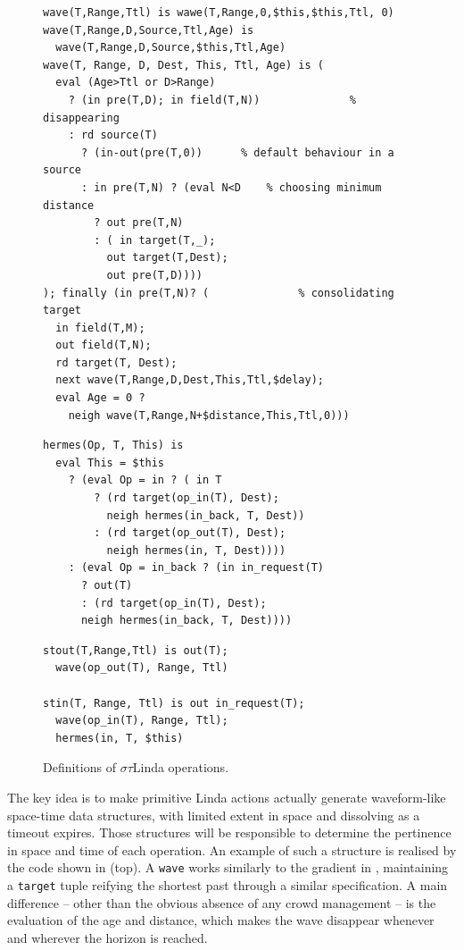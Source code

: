 \documentclass[12pt,a4paper,twoside,openright]{book}
\begin{document}
\begin{figure}
{\begin{Verbatim}[frame=single, commandchars=\\\{\}, label={\small \bf Wave-form: a space-time gradient}]
wave(T,Range,Ttl) is wawe(T,Range,0,$this,$this,Ttl, 0)
wave(T,Range,D,Source,Ttl,Age) is
  wave(T,Range,D,Source,$this,Ttl,Age)
wave(T, Range, D, Dest, This, Ttl, Age) is (
  eval (Age>Ttl or D>Range)
    ? (in pre(T,D); in field(T,N))              % disappearing
    : rd source(T)
      ? (in-out(pre(T,0))      % default behaviour in a source
      : in pre(T,N) ? (eval N<D    % choosing minimum distance
        ? out pre(T,N)
        : ( in target(T,_);
          out target(T,Dest); 
          out pre(T,D))))
); finally (in pre(T,N)? (              % consolidating target
  in field(T,M);
  out field(T,N);
  rd target(T, Dest);
  next wave(T,Range,D,Dest,This,Ttl,$delay);
  eval Age = 0 ?
    neigh wave(T,Range,N+$distance,This,Ttl,0)))
\end{Verbatim}
\begin{Verbatim}[frame=single, commandchars=\\\{\}, label={\small \bf Tuple retrieval}]
hermes(Op, T, This) is
  eval This = $this
    ? (eval Op = in ? ( in T
        ? (rd target(op_in(T), Dest);
          neigh hermes(in_back, T, Dest))
        : (rd target(op_out(T), Dest);
          neigh hermes(in, T, Dest))))
    : (eval Op = in_back ? (in in_request(T)
      ? out(T)
      : (rd target(op_in(T), Dest);
      neigh hermes(in_back, T, Dest))))
\end{Verbatim}
\begin{Verbatim}[frame=single, commandchars=\\\{\}, label={\small \bf Space-time Linda operations}]
stout(T,Range,Ttl) is out(T);
  wave(op_out(T), Range, Ttl)

stin(T, Range, Ttl) is out in_request(T); 
  wave(op_in(T), Range, Ttl);
  hermes(in, T, $this)
\end{Verbatim}
}
\vspace{-15pt}\caption{Definitions of $\sigma{}\tau{}$Linda operations.}
\label{img:case2}\vspace{-10pt}
\end{figure}

The key idea is to make primitive Linda actions actually generate waveform-like space-time data structures, with limited extent in space and dissolving as a timeout expires.
%
Those structures will be responsible to determine the pertinence in space and time of each operation.
%
An example of such a structure is realised by the code shown in  (top).
%
A \texttt{wave} works similarly to the gradient in , maintaining a \texttt{target} tuple reifying the shortest past through a similar specification.
%
A main difference -- other than the obvious absence of any crowd management -- is the evaluation of the age and distance, which makes the wave disappear whenever and wherever the horizon is reached.
\end{document}
